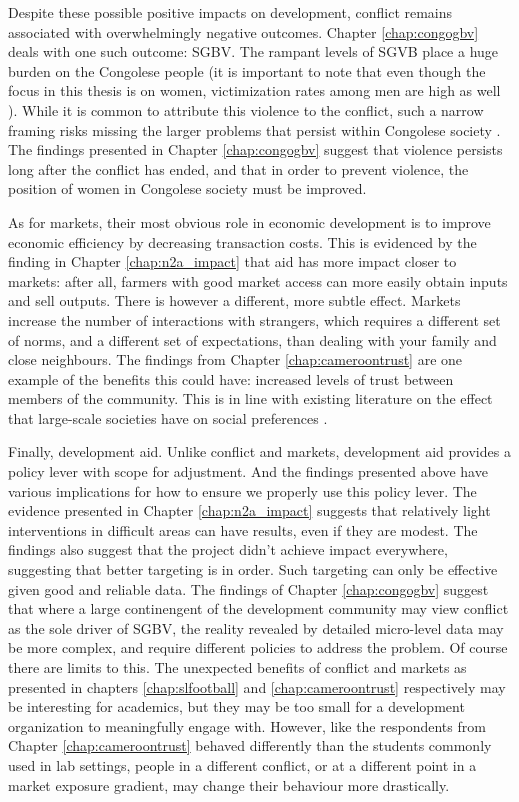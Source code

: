 Despite these possible positive impacts on development, conflict remains associated with overwhelmingly negative outcomes. Chapter \ref{chap:congogbv} deals with one such outcome: SGBV. The rampant levels of SGVB place a huge burden on the Congolese people (it is important to note that even though the focus in this thesis is on women, victimization rates among men are high as well \citep{Christian2011}). While it is common to attribute this violence to the conflict, such a narrow framing risks missing the larger problems that persist within Congolese society \citep[see e.g.][]{Autesserre2012a}. The findings presented in Chapter \ref{chap:congogbv} suggest that violence persists long after the conflict has ended, and that in order to prevent violence, the position of women in Congolese society must be improved.

As for markets, their most obvious role in economic development is to improve economic efficiency by decreasing transaction costs. This is evidenced by the finding in Chapter \ref{chap:n2a_impact} that aid has more impact closer to markets: after all, farmers with good market access can more easily obtain inputs and sell outputs. There is however a different, more subtle effect. Markets increase the number of interactions with strangers, which requires a different set of norms, and a different set of expectations, than dealing with your family and close neighbours. The findings from Chapter \ref{chap:cameroontrust} are one example of the benefits this could have: increased levels of trust between members of the community. This is in line with existing literature on the effect that large-scale societies have on social preferences \citep{Henrich2010}.

Finally, development aid. Unlike conflict and markets, development aid provides a policy lever with scope for adjustment. And the findings presented above have various implications for how to ensure we properly use this policy lever. The evidence presented in Chapter \ref{chap:n2a_impact} suggests that relatively light interventions in difficult areas can have results, even if they are modest. The findings also suggest that the project didn't achieve impact everywhere, suggesting that better targeting is in order. Such targeting can only be effective given good and reliable data. The findings of Chapter \ref{chap:congogbv} suggest that where a large continengent of the development community may view conflict as the sole driver of SGBV, the reality revealed by detailed micro-level data may be more complex, and require different policies to address the problem. Of course there are limits to this. The unexpected benefits of conflict and markets as presented in chapters \ref{chap:slfootball} and \ref{chap:cameroontrust} respectively may be interesting for academics, but they may be too small for a development organization to meaningfully engage with. However, like the respondents from Chapter \ref{chap:cameroontrust} behaved differently than the students commonly used in lab settings, people in a different conflict, or at a different point in a market exposure gradient, may change their behaviour more drastically. 

